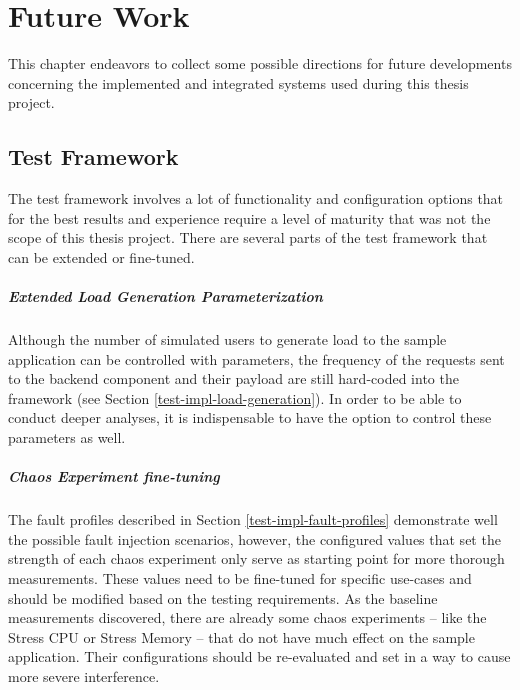 \chapter{Future Work} \label{future-work}

This chapter endeavors to collect some possible directions for future developments concerning the implemented and integrated systems used during this thesis project.

\section{Test Framework}

The test framework involves a lot of functionality and configuration options that for the best results and experience require a level of maturity that was not the scope of this thesis project. There are several parts of the test framework that can be extended or fine-tuned.

\paragraph{Extended Load Generation Parameterization} Although the number of simulated users to generate load to the sample application can be controlled with parameters, the frequency of the requests sent to the backend component and their payload are still hard-coded into the framework (see Section \ref{test-impl-load-generation}). In order to be able to conduct deeper analyses, it is indispensable to have the option to control these parameters as well.

\paragraph{Chaos Experiment fine-tuning} The fault profiles described in Section \ref{test-impl-fault-profiles} demonstrate well the possible fault injection scenarios, however, the configured values that set the strength of each chaos experiment only serve as starting point for more thorough measurements. These values need to be fine-tuned for specific use-cases and should be modified based on the testing requirements. As the baseline measurements discovered, there are already some chaos experiments -- like the Stress CPU or Stress Memory -- that do not have much effect on the sample application. Their configurations should be re-evaluated and set in a way to cause more severe interference.

